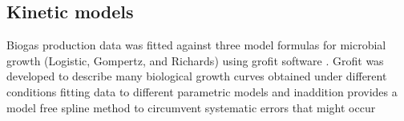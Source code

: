 \subsection{Kinetic models}
Biogas production data was fitted against three model formulas for microbial growth (Logistic, Gompertz, and Richards) using grofit software \cite{Kahm_2010}. Grofit was developed to describe many biological growth curves obtained under different conditions fitting data to different parametric models and inaddition provides a model free spline method to circumvent systematic errors that might
occur